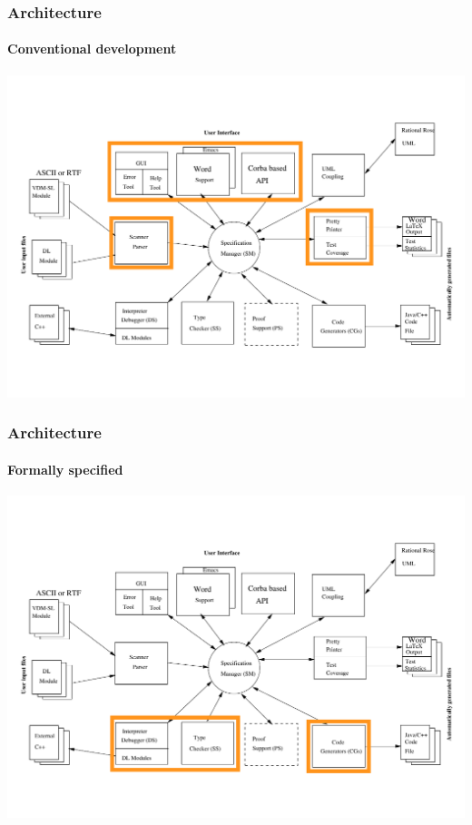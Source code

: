 \documentclass[slidestop,uncompress,mathserif,final]{beamer}
\newcommand{\pgl}[0]{Peter Gorm Larsen}
\begin{document}
\begin{frame}[c]
  \frametitle{Architecture}
  \framesubtitle{Conventional development}

  \begin{center}
    \includegraphics[width=\textwidth]{images/vdmtools_arch_conv_dev.pdf}
  \end{center}
\end{frame}

\begin{frame}[c]
  \frametitle{Architecture}
  \framesubtitle{Formally specified}

  \begin{center}
    \includegraphics[width=\textwidth]{images/vdmtools_arch_spec.pdf}
  \end{center}
\end{frame}
\end{document}
